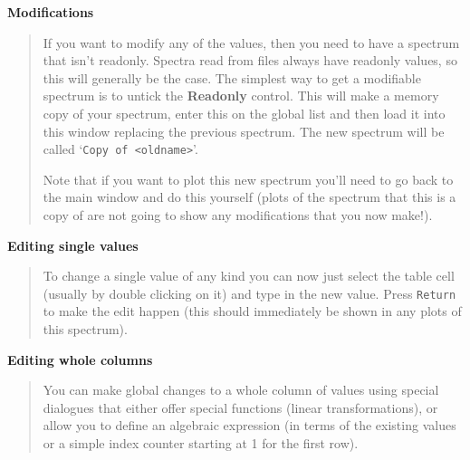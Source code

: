 \documentclass[twoside,11pt,nolof]{starlink}
\newcommand{\labelitem}[1]{\textbf{#1}}
\providecommand{\hitext}[1]{\texttt{#1}}
\providecommand{\subheading}[1]{\textbf{\large{#1}}}
\begin{document}
\subheading{Modifications}
\begin{quote}
 If you want to modify any of the values, then you need to have a
 spectrum that isn't readonly. Spectra read from files always have
 readonly values, so this will generally be the case. The simplest way
 to get a modifiable spectrum is to untick the \labelitem{Readonly}
 control. This will make a memory copy of your spectrum, enter this on
 the global list and then load it into this window replacing the
 previous spectrum. The new spectrum will be called
 `\hitext{Copy of <oldname>}'.

 Note that if you want to plot this new spectrum you'll need to go back
 to the main window and do this yourself (plots of the spectrum that
 this is a copy of are not going to show any modifications that you now
 make!).
\end{quote}

\subheading{Editing single values}
\begin{quote}
 To change a single value of any kind you can now just select the
 table cell (usually by double clicking on it) and type in the new
 value. Press \hitext{Return} to make the edit happen (this should
 immediately be shown in any plots of this spectrum).
\end{quote}

\subheading{Editing whole columns}
\begin{quote}
 You can make global changes to a whole column of values using special
 dialogues that either offer special functions (linear transformations),
 or allow you to define an algebraic expression (in terms of the
 existing values or a simple index counter starting at 1 for the first
 row).
\end{quote}
\end{document}
